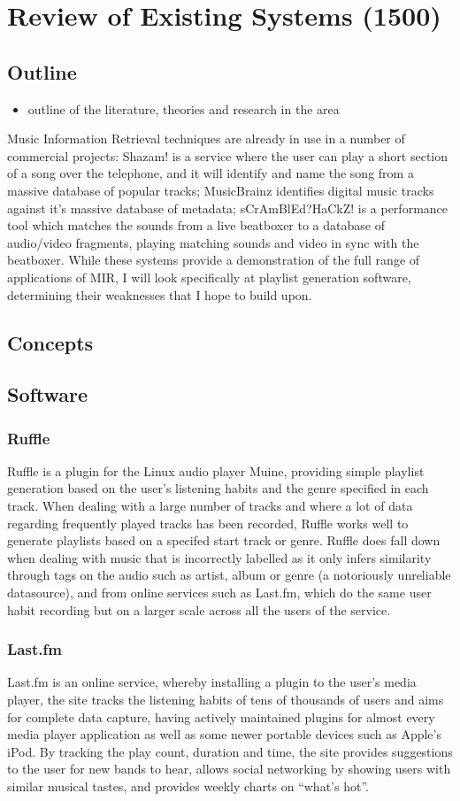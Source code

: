 \chapter{Review of Existing Systems (1500)}
\section{Outline}
\begin{itemize}
	\item outline of the literature, theories and research in the area
\end{itemize}
Music Information Retrieval techniques are already in use in a number of commercial projects: Shazam! is a service where the user can play a short section of a song over the telephone, and it will identify and name the song from a massive database of popular tracks; MusicBrainz identifies digital music tracks against it’s massive database of metadata; sCrAmBlEd?HaCkZ! is a performance tool which matches the sounds from a live beatboxer to a database of audio/video fragments, playing matching sounds and video in sync with the beatboxer. While these systems provide a demonstration of the full range of applications of MIR, I will look specifically at playlist generation software, determining their weaknesses that I hope to build upon.
\section{Concepts}
\section{Software}
\subsection{Ruffle}
Ruffle is a plugin for the Linux audio player Muine, providing simple playlist generation based on the user’s listening habits and the genre specified in each track. When dealing with a large number of tracks and where a lot of data regarding frequently played tracks has been recorded, Ruffle works well to generate playlists based on a specifed start track or genre. Ruffle does fall down when dealing with music that is incorrectly labelled as it only infers similarity through tags on the audio such as artist, album or genre (a notoriously unreliable datasource), and from online services such as Last.fm, which do the same user habit recording but on a larger scale across all the users of the service.
\subsection{Last.fm}
Last.fm is an online service, whereby installing a plugin to the user's media player, the site tracks the listening habits of tens of thousands of users and aims for complete data capture, having actively maintained plugins for almost every media player application as well as some newer portable devices such as Apple's iPod. By tracking the play count, duration and time, the site provides suggestions to the user for new bands to hear, allows social networking by showing users with similar musical tastes, and provides weekly charts on ``what's hot''.

